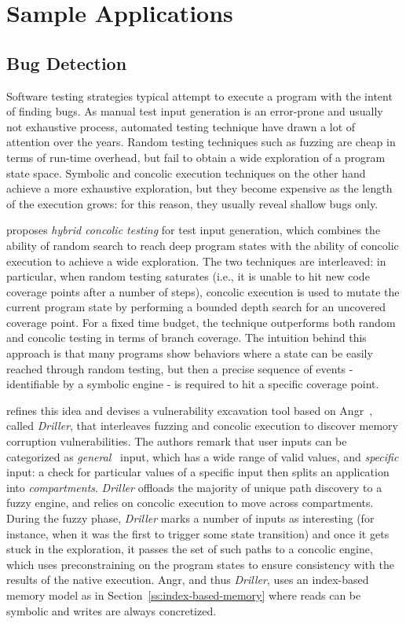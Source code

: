 
\section{Sample Applications}
\label{se:applications}

\subsection{Bug Detection}
\label{ss:bug-detection}

Software testing strategies typical attempt to execute a program with the intent of finding bugs. As manual test input generation is an error-prone and usually not exhaustive process, automated testing technique have drawn a lot of attention over the years. Random testing techniques such as fuzzing are cheap in terms of run-time overhead, but fail to obtain a wide exploration of a program state space. Symbolic and concolic execution techniques on the other hand achieve a more exhaustive exploration, but they become expensive as the length of the execution grows: for this reason, they usually reveal shallow bugs only.

\cite{RK-ICSE07} proposes {\em hybrid concolic testing} for test input generation, which combines the ability of random search to reach deep program states with the ability of concolic execution to achieve a wide exploration. The two techniques are interleaved: in particular, when random testing saturates (i.e., it is unable to hit new code coverage points after a number of steps), concolic execution is used to mutate the current program state by performing a bounded depth search for an uncovered coverage point. For a fixed time budget, the technique outperforms both random and concolic testing in terms of branch coverage. The intuition behind this approach is that many programs show behaviors where a state can be easily reached through random testing, but then a precise sequence of events - identifiable by a symbolic engine - is required to hit a specific coverage point.

\cite{DRILLER-NDSS16} refines this idea and devises a vulnerability excavation tool based on {\sc Angr}~\cite{ANGR-SSP16}, called {\em Driller}, that interleaves fuzzing and concolic execution to discover memory corruption vulnerabilities. The authors remark that user inputs can be categorized as {\em general}  input, which has a wide range of valid values, and {\em specific} input: a check for particular values of a specific input then splits an application into {\em compartments}. {\em Driller} offloads the majority of unique path discovery to a fuzzy engine, and relies on concolic execution to move across compartments. During the fuzzy phase, {\em Driller} marks a number of inputs as interesting (for instance, when it was the first to trigger some state transition) and once it gets stuck in the exploration, it passes the set of such paths to a concolic engine, which uses preconstraining on the program states to ensure consistency with the results of the native execution. {\sc Angr}, and thus {\em Driller}, uses an index-based memory model as in Section~\ref{ss:index-based-memory} where reads can be symbolic and writes are always concretized. %

